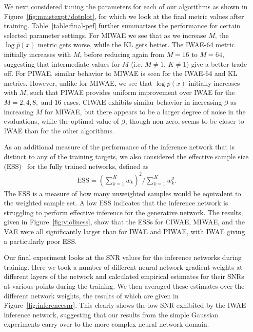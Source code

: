 We next considered tuning the parameters for each of
our algorithms as shown in Figure~\ref{fig:mnistexpt/dotplot}, for
which we look at the final metric values after training.
Table~\ref{table:final-pef} further summarizes the performance
for certain selected parameter settings. For \gls{MIWAE} we see that as we increase $M$, 
the $\log \hat{p}(x)$ metric gets worse, while the \textsc{KL}
gets better.  The \gls{IWAE}-64  metric initially increases with $M$, before reducing
again from $M=16$ to $M=64$, suggesting that intermediate
values for $M$ (i.e. $M\neq1$, $K\neq1$) give a better trade-off.  For \gls{PIWAE}, similar
behavior to \gls{MIWAE} is seen for the \gls{IWAE}-64 
and \textsc{KL} metrics.  However, unlike for \gls{MIWAE}, we see that 
$\log \hat{p}(x)$ initially increases with $M$, such that 
\gls{PIWAE} provides uniform improvement over \gls{IWAE}
for the $M=2,4,8,$ and $16$ cases.  
\gls{CIWAE} exhibits similar behavior in increasing $\beta$
as increasing $M$ for \gls{MIWAE}, but there appears to
be a larger degree of noise in the evaluations, while the optimal
value of $\beta$, though non-zero, seems to be closer
to \gls{IWAE} than for the other algorithms.

As an additional measure of the performance of the inference
network that is distinct to any of the training targets, 
we also considered the effective sample size (ESS)~\cite{mcbook}
for the fully trained networks, defined as
\begin{align}
\text{ESS} = (\textstyle \sum_{k=1}^K w_k)^2 / \textstyle \sum_{k=1}^K w_k^2.
\end{align}
The ESS is a measure of how many unweighted samples would be equivalent
to the weighted sample set.  
A low $\text{ESS}$ indicates that the inference network is struggling to
perform effective inference for the generative network.
The results, given in Figure~\ref{fig:violiness}, show that the
ESSs for \gls{CIWAE}, \gls{MIWAE}, and the \gls{VAE} were
all significantly larger than for \gls{IWAE} and \gls{PIWAE},
with \gls{IWAE} giving a particularly poor ESS.

Our final experiment looks at the \gls{SNR} values for the 
inference networks during training.  Here we took a number of different neural network gradient weights
at different layers of the network and calculated empirical estimates
for their \gls{SNR}s at various points during the training.  We then
averaged these estimates over the different network weights, the 
results of which are given in Figure~\ref{fig:inferencesnr}.  This
clearly shows the low \gls{SNR} exhibited by the \gls{IWAE}
inference network, suggesting that our results from the simple
Gaussian experiments carry over to the more complex neural network
domain.

